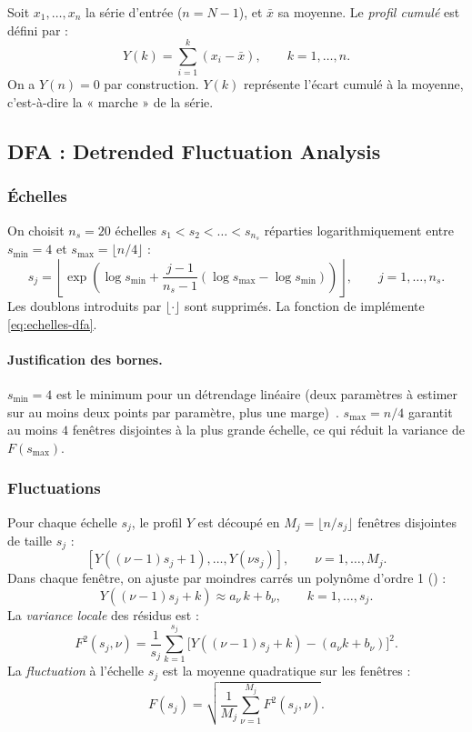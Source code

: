 \documentclass[11pt,a4paper]{article}
\theoremstyle{definition}
\newcommand{\code}[1]{\texttt{\detokenize{#1}}}
\newcommand{\dC}[1]{\texttt{\detokenize{#1}}}  %
\begin{document}
Soit $x_1, \dots, x_n$ la série d'entrée ($n = N-1$), et $\bar x$ sa moyenne.
Le \emph{profil cumulé} est défini par :
\begin{equation}
  Y(k) = \sum_{i=1}^{k}(x_i - \bar x), \qquad k = 1, \dots, n.
  \label{eq:profil}
\end{equation}
On a $Y(n) = 0$ par construction. $Y(k)$ représente l'écart cumulé à la moyenne,
c'est-à-dire la « marche » de la série.

\subsection{DFA : Detrended Fluctuation Analysis}

\subsubsection{Échelles}

On choisit $n_s = 20$ échelles $s_1 < s_2 < \dots < s_{n_s}$ réparties
logarithmiquement entre $s_{\min} = 4$ et $s_{\max} = \lfloor n/4 \rfloor$ :
\begin{equation}
  s_j = \left\lfloor \exp\!\left(
    \log s_{\min} + \frac{j-1}{n_s - 1}(\log s_{\max} - \log s_{\min})
  \right) \right\rfloor, \qquad j = 1, \dots, n_s.
  \label{eq:echelles-dfa}
\end{equation}
Les doublons introduits par $\lfloor \cdot \rfloor$ sont supprimés. La fonction
\code{echelles_dfa} de \dC{dfa.py} implémente \eqref{eq:echelles-dfa}.

\paragraph{Justification des bornes.} $s_{\min} = 4$ est le minimum pour un
détrendage linéaire (deux paramètres à estimer sur au moins deux points par
paramètre, plus une marge)~\cite{peng1994}. $s_{\max} = n/4$ garantit au moins
$4$ fenêtres disjointes à la plus grande échelle, ce qui réduit la variance de
$F(s_{\max})$.

\subsubsection{Fluctuations}

Pour chaque échelle $s_j$, le profil $Y$ est découpé en
$M_j = \lfloor n/s_j \rfloor$ fenêtres disjointes de taille $s_j$ :
\[
  \left[Y((\nu-1)s_j + 1), \dots, Y(\nu s_j)\right],
  \qquad \nu = 1, \dots, M_j.
\]
Dans chaque fenêtre, on ajuste par moindres carrés un polynôme d'ordre 1
(\code{DFA_ORDRE = 1}) :
\[
  Y((\nu-1)s_j + k) \approx a_\nu\, k + b_\nu,
  \qquad k = 1, \dots, s_j.
\]
La \emph{variance locale} des résidus est :
\[
  F^2(s_j, \nu) = \frac{1}{s_j}\sum_{k=1}^{s_j}
  \bigl[Y((\nu-1)s_j + k) - (a_\nu k + b_\nu)\bigr]^2.
\]
La \emph{fluctuation} à l'échelle $s_j$ est la moyenne quadratique sur les
fenêtres :
\begin{equation}
  F(s_j) = \sqrt{\frac{1}{M_j} \sum_{\nu=1}^{M_j} F^2(s_j, \nu)}.
  \label{eq:F-s}
\end{equation}
\end{document}
